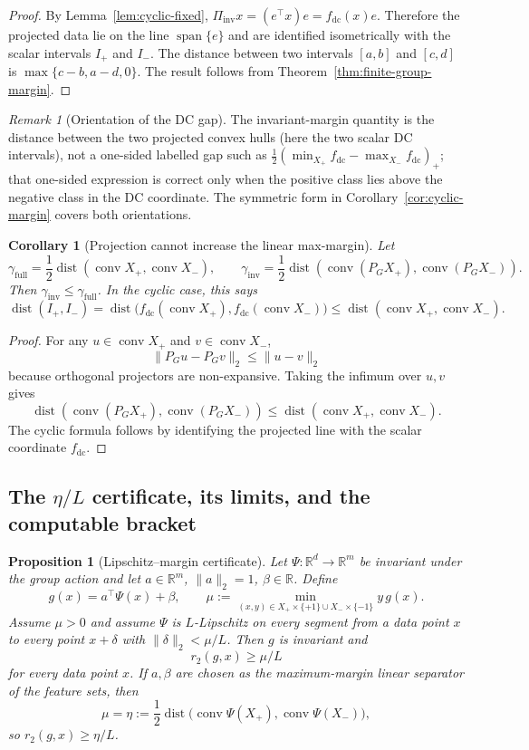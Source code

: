 \documentclass[11pt]{article}
\theoremstyle{plain}
\newtheorem{corollary}{Corollary}
\newtheorem{proposition}{Proposition}
\theoremstyle{definition}
\theoremstyle{remark}
\newtheorem{remark}{Remark}
\newcommand{\R}{\mathbb{R}}
\newcommand{\fdc}{f_{\mathrm{dc}}}
\newcommand{\Piinv}{\Pi_{\mathrm{inv}}}
\newcommand{\conv}{\operatorname{conv}}
\newcommand{\dist}{\operatorname{dist}}
\begin{document}
\begin{proof}
By Lemma~\ref{lem:cyclic-fixed}, $\Piinv x=(e^\top x)e=\fdc(x)e$.  Therefore the projected data lie on the line $\operatorname{span}\{e\}$ and are identified isometrically with the scalar intervals $I_+$ and $I_-$.  The distance between two intervals $[a,b]$ and $[c,d]$ is $\max\{c-b,a-d,0\}$.  The result follows from Theorem~\ref{thm:finite-group-margin}.
\end{proof}

\begin{remark}[Orientation of the DC gap]
The invariant-margin quantity is the distance between the two projected convex hulls (here the two scalar DC intervals), not a one-sided labelled gap such as $\tfrac12(\min_{X_+}\fdc-\max_{X_-}\fdc)_+$; that one-sided expression is correct only when the positive class lies above the negative class in the DC coordinate.  The symmetric form in Corollary~\ref{cor:cyclic-margin} covers both orientations.
\end{remark}

\begin{corollary}[Projection cannot increase the linear max-margin]\label{cor:projection-cannot-increase}
Let
\[
\gamma_{\mathrm{full}}=\frac12\dist(\conv X_+,\conv X_-),\qquad
\gamma_{\mathrm{inv}}=\frac12\dist(\conv(P_GX_+),\conv(P_GX_-)).
\]
Then $\gamma_{\mathrm{inv}}\le \gamma_{\mathrm{full}}$.  In the cyclic case, this says
\[
\dist(I_+,I_-)
=\dist\big(\fdc(\conv X_+),\fdc(\conv X_-)\big)
\le \dist(\conv X_+,\conv X_-).
\]
\end{corollary}

\begin{proof}
For any $u\in\conv X_+$ and $v\in\conv X_-$,
\[
\|P_Gu-P_Gv\|_2\le \|u-v\|_2
\]
because orthogonal projectors are non-expansive.  Taking the infimum over $u,v$ gives
\[
\dist(\conv(P_GX_+),\conv(P_GX_-))\le \dist(\conv X_+,\conv X_-).
\]
The cyclic formula follows by identifying the projected line with the scalar coordinate $\fdc$.
\end{proof}

\subsection{The $\eta/L$ certificate, its limits, and the computable bracket}\label{app:etal-supporting}

\begin{proposition}[Lipschitz--margin certificate]\label{prop:lipschitz-margin}
Let $\Psi:\R^d\to\R^m$ be invariant under the group action and let $a\in\R^m$, $\|a\|_2=1$, $\beta\in\R$.  Define
\[
g(x)=a^\top\Psi(x)+\beta,
\qquad
\mu:=\min_{(x,y)\in X_+\times\{+1\}\cup X_-\times\{-1\}} y\,g(x).
\]
Assume $\mu>0$ and assume $\Psi$ is $L$-Lipschitz on every segment from a data point $x$ to every point $x+\delta$ with $\|\delta\|_2<\mu/L$.  Then $g$ is invariant and
\[
r_2(g,x)\ge \mu/L
\]
for every data point $x$.  If $a,\beta$ are chosen as the maximum-margin linear separator of the feature sets, then
\[
\mu=\eta:=\frac12\dist\big(\conv\Psi(X_+),\conv\Psi(X_-)\big),
\]
so $r_2(g,x)\ge\eta/L$.
\end{proposition}
\end{document}
